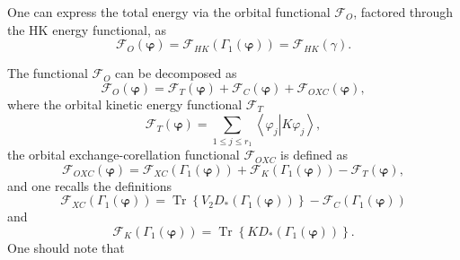 \documentclass[aps,preprint]{revtex4}%
\begin{document}
One can express the total energy via the orbital functional $\mathcal{F}_{O}$,
factored through the HK energy functional, as
\begin{equation}
\mathcal{F}_{O}\left(  \mathbf{\varphi}\right)  =\mathcal{F}_{HK}\left(
\Gamma_{1}\left(  \mathbf{\varphi}\right)  \right)  =\mathcal{F}_{HK}\left(
\gamma\right)  . \label{FO}%
\end{equation}


The functional $\mathcal{F}_{O}$ can be decomposed as
\begin{equation}
\mathcal{F}_{O}\left(  \mathbf{\varphi}\right)  =\mathcal{F}_{T}\left(
\mathbf{\varphi}\right)  +\mathcal{F}_{C}\left(  \mathbf{\varphi}\right)
+\mathcal{F}_{OXC}\left(  \mathbf{\varphi}\right)  , \label{KS1}%
\end{equation}
where the orbital kinetic energy functional $\mathcal{F}_{T}$
\begin{equation}
\mathcal{F}_{T}\left(  \mathbf{\varphi}\right)  =\sum_{1\leq j\leq r_{1}%
}\left\langle \varphi_{j}\left\vert K\varphi_{j}\right.  \right\rangle ,
\end{equation}
the orbital exchange-corellation functional $\mathcal{F}_{OXC}$ is defined as
\begin{equation}
\mathcal{F}_{OXC}\left(  \mathbf{\varphi}\right)  =\mathcal{F}_{XC}\left(
\Gamma_{1}\left(  \mathbf{\varphi}\right)  \right)  +\mathcal{F}_{K}\left(
\Gamma_{1}\left(  \mathbf{\varphi}\right)  \right)  -\mathcal{F}_{T}\left(
\mathbf{\varphi}\right)  , \label{KS2}%
\end{equation}
and one recalls the definitions
\begin{equation}
\mathcal{F}_{XC}\left(  \Gamma_{1}\left(  \mathbf{\varphi}\right)  \right)
=\operatorname{Tr}\left\{  V_{2}D_{\ast}\left(  \Gamma_{1}\left(
\mathbf{\varphi}\right)  \right)  \right\}  -\mathcal{F}_{C}\left(  \Gamma
_{1}\left(  \mathbf{\varphi}\right)  \right)  \label{KS3}%
\end{equation}
and
\begin{equation}
\mathcal{F}_{K}\left(  \Gamma_{1}\left(  \mathbf{\varphi}\right)  \right)
=\operatorname{Tr}\left\{  KD_{\ast}\left(  \Gamma_{1}\left(  \mathbf{\varphi
}\right)  \right)  \right\}  . \label{KS4}%
\end{equation}
One should note that
\end{document}
